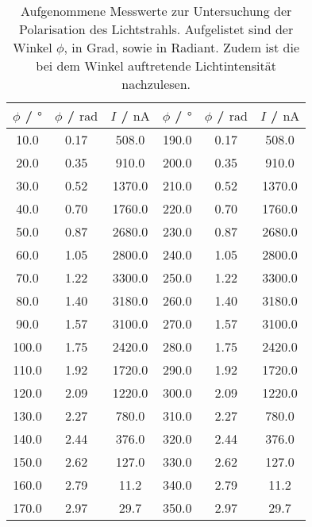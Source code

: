 \begin{table}
\centering
\caption{Aufgenommene Messwerte zur Untersuchung der Polarisation des Lichtstrahls.
Aufgelistet sind der Winkel $\phi$, in Grad, sowie in Radiant. Zudem ist die bei dem
Winkel auftretende Lichtintensität nachzulesen.}
\label{tab:pol}
\begin{tabular}{cccccc}
\toprule
$\phi$ / $\si{\degree}$ & $\phi$ / $\si{\radian}$ & $I$ / $\si{\nano\ampere}$ & $\phi$ / $\si{\degree}$ & $\phi$ / $\si{\radian}$ & $I$ / $\si{\nano\ampere}$ \\
\midrule
10.0 & 0.17 & 508.0 & 190.0 & 0.17 & 508.0 \\
20.0 & 0.35 & 910.0 & 200.0 & 0.35 & 910.0 \\
30.0 & 0.52 & 1370.0 & 210.0 & 0.52 & 1370.0 \\
40.0 & 0.70 & 1760.0 & 220.0 & 0.70 & 1760.0 \\
50.0 & 0.87 & 2680.0 & 230.0 & 0.87 & 2680.0 \\
60.0 & 1.05 & 2800.0 & 240.0 & 1.05 & 2800.0 \\
70.0 & 1.22 & 3300.0 & 250.0 & 1.22 & 3300.0 \\
80.0 & 1.40 & 3180.0 & 260.0 & 1.40 & 3180.0 \\
90.0 & 1.57 & 3100.0 & 270.0 & 1.57 & 3100.0 \\
100.0 & 1.75 & 2420.0 & 280.0 & 1.75 & 2420.0 \\
110.0 & 1.92 & 1720.0 & 290.0 & 1.92 & 1720.0 \\
120.0 & 2.09 & 1220.0 & 300.0 & 2.09 & 1220.0 \\
130.0 & 2.27 & 780.0 & 310.0 & 2.27 & 780.0 \\
140.0 & 2.44 & 376.0 & 320.0 & 2.44 & 376.0 \\
150.0 & 2.62 & 127.0 & 330.0 & 2.62 & 127.0 \\
160.0 & 2.79 & 11.2 & 340.0 & 2.79 & 11.2 \\
170.0 & 2.97 & 29.7 & 350.0 & 2.97 & 29.7 \\
\bottomrule
\end{tabular}
\end{table}
